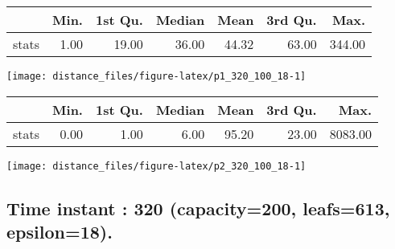 \documentclass[
  9pt,
  landscape]{article}
\begin{document}
\begin{minipage}{0.5\textwidth} 
\centering 
\begin{tabular}{rrrrrrr}
  \hline
 & Min. & 1st Qu. & Median & Mean & 3rd Qu. & Max. \\ 
  \hline
stats & 1.00 & 19.00 & 36.00 & 44.32 & 63.00 & 344.00 \\ 
   \hline
\end{tabular}
\vspace{0.5cm} 


\texttt{[image: distance\_files/figure-latex/p1\_320\_100\_18-1]} 

\end{minipage} 
\begin{minipage}{0.5\textwidth} 
\centering 
\begin{tabular}{rrrrrrr}
  \hline
 & Min. & 1st Qu. & Median & Mean & 3rd Qu. & Max. \\ 
  \hline
stats & 0.00 & 1.00 & 6.00 & 95.20 & 23.00 & 8083.00 \\ 
   \hline
\end{tabular}
\vspace{0.5cm} 


\texttt{[image: distance\_files/figure-latex/p2\_320\_100\_18-1]} 

\end{minipage}

\pagebreak

\hypertarget{time-instant-320-capacity200-leafs613-epsilon18.}{%
\subsection{Time instant : 320 (capacity=200, leafs=613,
epsilon=18).}\label{time-instant-320-capacity200-leafs613-epsilon18.}}
\end{document}
